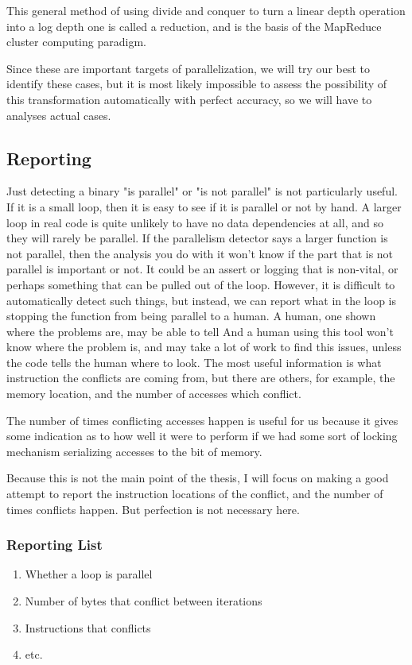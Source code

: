 \documentclass[12pt,twoside]{reedthesis}
\begin{document}
		This general method of using divide and conquer to turn a linear depth operation into a log depth one is called a reduction, and is the basis of the MapReduce cluster computing paradigm.

		Since these are important targets of parallelization, we will try our best to identify these cases, but it is most likely impossible to assess the possibility of this transformation automatically with perfect accuracy, so we will have to analyses actual cases.

		\subsection{Reporting}

		Just detecting a binary "is parallel" or "is not parallel" is not particularly useful. If it is a small loop, then it is easy to see if it is parallel or not by hand. A larger loop in real code is quite unlikely to have no data dependencies at all, and so they will rarely be parallel. If the parallelism detector says a larger function is not parallel, then the analysis you do with it won't know if the part that is not parallel is important or not. It could be an assert or logging that is non-vital, or perhaps something that can be pulled out of the loop. However, it is difficult to automatically detect such things, but instead, we can report what in the loop is stopping the function from being parallel to a human. A human, one shown where the problems are, may be able to tell  And a human using this tool won't know where the problem is, and may take a lot of work to find this issues, unless the code tells the human where to look. The most useful information is what instruction the conflicts are coming from, but there are others, for example, the memory location, and the number of accesses which conflict.

		The number of times conflicting accesses happen is useful for us because it gives some indication as to how well it were to perform if we had some sort of locking mechanism serializing accesses to the bit of memory.

		Because this is not the main point of the thesis, I will focus on making a good attempt to report the instruction locations of the conflict, and the number of times conflicts happen. But perfection is not necessary here.

		\subsubsection{Reporting List}
		\begin{enumerate}
			\item Whether a loop is parallel
			\item Number of bytes that conflict between iterations
			\item Instructions that conflicts
			\item etc.
		\end{enumerate}
\end{document}
